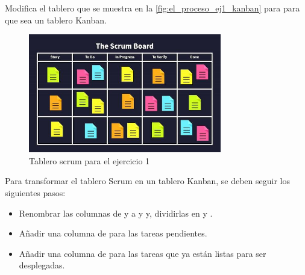 

\begin{enunciado}
    Modifica el tablero que se muestra en la \autoref{fig:el_proceso_ej1_kanban} para para que sea un tablero Kanban.
\end{enunciado}

\begin{figure}[h!]
    \centering
    \includegraphics[width=0.75\textwidth]{../rsc/el_proceso_ej1_scrum}
    \caption{Tablero scrum para el ejercicio 1}
    \label{fig:el_proceso_ej1_kanban}
\end{figure}

\begin{solucion}
    Para transformar el tablero Scrum en un tablero Kanban, se deben seguir los siguientes pasos:
    \begin{itemize}
        \item Renombrar las columnas de  y  a  y  y, dividirlas en  y .
        \item Añadir una columna de  para las tareas pendientes.
        \item Añadir una columna de  para las tareas que ya están listas para ser desplegadas.
    \end{itemize}
\end{solucion}